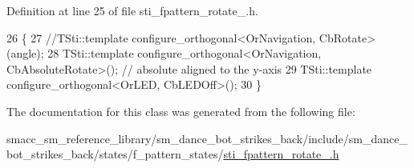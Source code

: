 Definition at line 25 of file sti\+\_\+fpattern\+\_\+rotate\+\_.\+h.


\begin{DoxyCode}
26   \{
27     \textcolor{comment}{//TSti::template configure\_orthogonal<OrNavigation, CbRotate>(angle);}
28     TSti::template configure\_orthogonal<OrNavigation, CbAbsoluteRotate>(); \textcolor{comment}{// absolute aligned to the
       y-axis}
29     TSti::template configure\_orthogonal<OrLED, CbLEDOff>();
30   \}
\end{DoxyCode}


The documentation for this class was generated from the following file\+:\begin{DoxyCompactItemize}
\item 
smacc\+\_\+sm\+\_\+reference\+\_\+library/sm\+\_\+dance\+\_\+bot\+\_\+strikes\+\_\+back/include/sm\+\_\+dance\+\_\+bot\+\_\+strikes\+\_\+back/states/f\+\_\+pattern\+\_\+states/\hyperlink{strikes__back_2include_2sm__dance__bot__strikes__back_2states_2f__pattern__states_2sti__fpattern__rotate__1_8h}{sti\+\_\+fpattern\+\_\+rotate\+\_.\+h}\end{DoxyCompactItemize}
